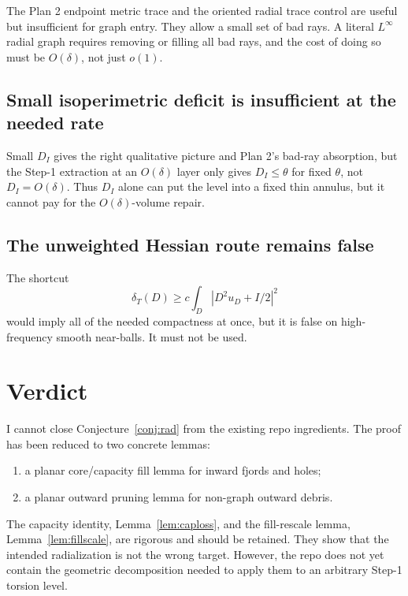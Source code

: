 \documentclass[11pt]{article}
\newcommand{\dT}{\delta_T}
\begin{document}
The Plan 2 endpoint metric trace and the oriented radial trace control
are useful but insufficient for graph entry.  They allow a small set of
bad rays.  A literal \(L^\infty\) radial graph requires removing or
filling all bad rays, and the cost of doing so must be \(O(\delta)\), not
just \(o(1)\).

\subsection{Small isoperimetric deficit is insufficient at the needed rate}

Small \(D_I\) gives the right qualitative picture and Plan 2's bad-ray
absorption, but the Step-1 extraction at an \(O(\delta)\) layer only
gives \(D_I\le\theta\) for fixed \(\theta\), not \(D_I=O(\delta)\).
Thus \(D_I\) alone can put the level into a fixed thin annulus, but it
cannot pay for the \(O(\delta)\)-volume repair.

\subsection{The unweighted Hessian route remains false}

The shortcut
\[
   \dT(D)\ge c\int_D |D^2u_D+I/2|^2
\]
would imply all of the needed compactness at once, but it is false on
high-frequency smooth near-balls.  It must not be used.

\section{Verdict}

I cannot close Conjecture~\ref{conj:rad} from the existing repo
ingredients.  The proof has been reduced to two concrete lemmas:

\begin{enumerate}
\item a planar core/capacity fill lemma for inward fjords and holes;
\item a planar outward pruning lemma for non-graph outward debris.
\end{enumerate}

The capacity identity, Lemma~\ref{lem:caploss}, and the fill-rescale
lemma, Lemma~\ref{lem:fillscale}, are rigorous and should be retained.
They show that the intended radialization is not the wrong target.
However, the repo does not yet contain the geometric decomposition
needed to apply them to an arbitrary Step-1 torsion level.
\end{document}
